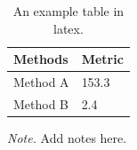 \documentclass{aitthesis}
\begin{document}








\pagestyle{plain}







\newpage
{}
{}


\newpage\pagestyle{plain}



\begin{table}
\caption{An example table in latex.}
\begin{center}
\begin{tabular}{l l}
\hline
    Methods & Metric\\ \hline
Method A      & 153.3                \\ 
Method B & 2.4                  \\ \hline
\end{tabular}
\label{tab:monkey}
\end{center}
\small{\textit{Note.} Add notes here.}
\end{table}
\end{document}
